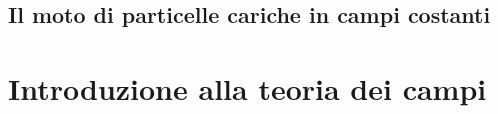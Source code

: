 \documentclass[12pt,a4paper]{book}
\numberwithin{equation}{section}
\begin{document}
\begin{sloppypar}
\section{Il moto di particelle cariche in campi costanti}




\chapter{Introduzione alla teoria dei campi}





\appendix





\end{sloppypar}
\end{document}
